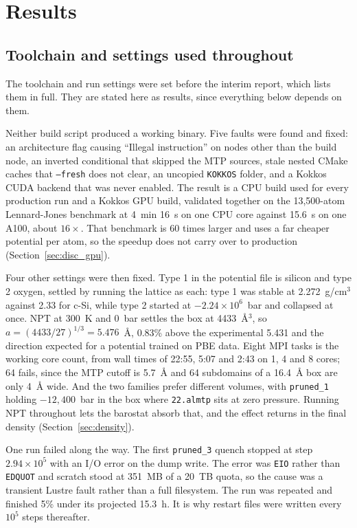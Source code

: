 \documentclass[11pt]{article}
\begin{document}
\section{Results}

\subsection{Toolchain and settings used throughout}
\label{sec:carried}
\label{sec:builds}
The toolchain and run settings were set before the interim report, which lists them in full. They are stated here as results, since everything below depends on them.

Neither build script produced a working binary. Five faults were found and fixed: an architecture flag causing ``Illegal instruction'' on nodes other than the build node, an inverted conditional that skipped the MTP sources, stale nested CMake caches that \texttt{--fresh} does not clear, an uncopied \texttt{KOKKOS} folder, and a Kokkos CUDA backend that was never enabled. The result is a CPU build used for every production run and a Kokkos GPU build, validated together on the 13{,}500-atom Lennard-Jones benchmark at 4~min 16~s on one CPU core against 15.6~s on one A100, about $16\times$. That benchmark is 60 times larger and uses a far cheaper potential per atom, so the speedup does not carry over to production (Section~\ref{sec:disc_gpu}).

Four other settings were then fixed. Type 1 in the potential file is silicon and type 2 oxygen, settled by running the lattice as each: type 1 was stable at 2.272~g/cm$^3$ against 2.33 for c-Si, while type 2 started at $-2.24\times10^6$~bar and collapsed at once. NPT at 300~K and 0~bar settles the box at 4433~\AA$^3$, so $a = (4433/27)^{1/3} = 5.476$~\AA, 0.83\% above the experimental 5.431 and the direction expected for a potential trained on PBE data. Eight MPI tasks is the working core count, from wall times of 22:55, 5:07 and 2:43 on 1, 4 and 8 cores; 64 fails, since the MTP cutoff is 5.7~\AA{} and 64 subdomains of a 16.4~\AA{} box are only 4~\AA{} wide. And the two families prefer different volumes, with \texttt{pruned\_1} holding $-12{,}400$~bar in the box where \texttt{22.almtp} sits at zero pressure. Running NPT throughout lets the barostat absorb that, and the effect returns in the final density (Section~\ref{sec:density}).

One run failed along the way. The first \texttt{pruned\_3} quench stopped at step $2.94\times10^5$ with an I/O error on the dump write. The error was \texttt{EIO} rather than \texttt{EDQUOT} and scratch stood at 351~MB of a 20~TB quota, so the cause was a transient Lustre fault rather than a full filesystem. The run was repeated and finished 5\% under its projected 15.3~h. It is why restart files were written every $10^5$ steps thereafter.
\end{document}
